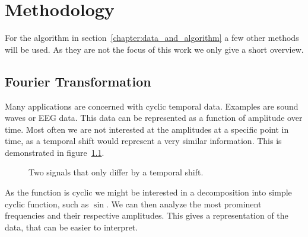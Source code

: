 \chapter{Methodology}
\label{chapter:methodology}

For the algorithm in section~\ref{chapter:data_and_algorithm} a few other methods will be used. As they are not the focus of this work we only give a short overview.

\section{Fourier Transformation}
\label{sec:fourier_transformation}

Many applications are concerned with cyclic temporal data. Examples are sound waves or EEG data. This data can be represented as a function of amplitude over time. Most often we are not interested at the amplitudes at a specific point in time, as a temporal shift would represent a very similar information. This is demonstrated in figure~\ref{fig:tempoal_shift}.

\begin{figure}[h]
	\centering
	
	\begin{subfigure}[b]{\textwidth}
	\end{subfigure}
	
	\caption{Two signals that only differ by a temporal shift.}
	\label{fig:tempoal_shift}
\end{figure}

As the function is cyclic we might be interested in a decomposition into simple cyclic function, such as $\sin$. We can then analyze the most prominent frequencies and their respective amplitudes. This gives a representation of the data, that can be easier to interpret.

